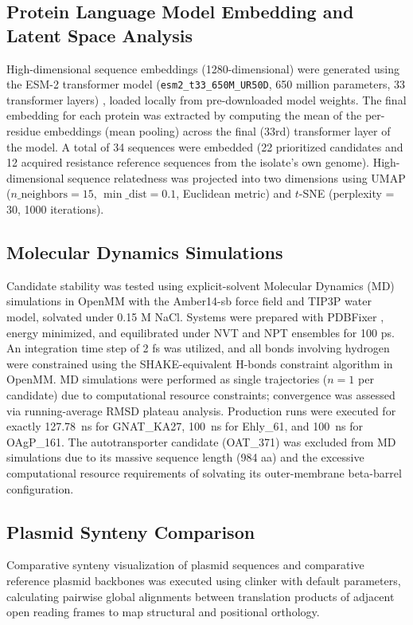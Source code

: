 \documentclass[pdflatex,sn-mathphys-num]{sn-jnl}
\begin{document}
\subsection{Protein Language Model Embedding and Latent Space Analysis}\label{subsec:plm}
High-dimensional sequence embeddings (1280-dimensional) were generated using the ESM-2 transformer model (\texttt{esm2\_t33\_650M\_UR50D}, 650 million parameters, 33 transformer layers) \cite{rives2021biological}, loaded locally from pre-downloaded model weights. The final embedding for each protein was extracted by computing the mean of the per-residue embeddings (mean pooling) across the final (33rd) transformer layer of the model. A total of 34 sequences were embedded (22 prioritized candidates and 12 acquired resistance reference sequences from the isolate's own genome). High-dimensional sequence relatedness was projected into two dimensions using UMAP \cite{mcinnes2018umap} ($n\_\text{neighbors}=15$, $\min\_\text{dist}=0.1$, Euclidean metric) and $t$-SNE (perplexity = 30, 1000 iterations).

\subsection{Molecular Dynamics Simulations}\label{subsec:md}
Candidate stability was tested using explicit-solvent Molecular Dynamics (MD) simulations in OpenMM \cite{eastman2017openmm} with the Amber14-sb force field and TIP3P water model, solvated under 0.15 M NaCl. Systems were prepared with PDBFixer \cite{pdbfixer}, energy minimized, and equilibrated under NVT and NPT ensembles for 100 ps. An integration time step of 2 fs was utilized, and all bonds involving hydrogen were constrained using the SHAKE-equivalent H-bonds constraint algorithm in OpenMM. MD simulations were performed as single trajectories ($n=1$ per candidate) due to computational resource constraints; convergence was assessed via running-average RMSD plateau analysis. Production runs were executed for exactly 127.78~ns for GNAT\_KA27, 100~ns for Ehly\_61, and 100~ns for OAgP\_161. The autotransporter candidate (OAT\_371) was excluded from MD simulations due to its massive sequence length (984 aa) and the excessive computational resource requirements of solvating its outer-membrane beta-barrel configuration.

\subsection{Plasmid Synteny Comparison}\label{subsec:synteny}
Comparative synteny visualization of plasmid sequences and comparative reference plasmid backbones was executed using clinker \cite{gilchrist2021clinker} with default parameters, calculating pairwise global alignments between translation products of adjacent open reading frames to map structural and positional orthology.
\end{document}
